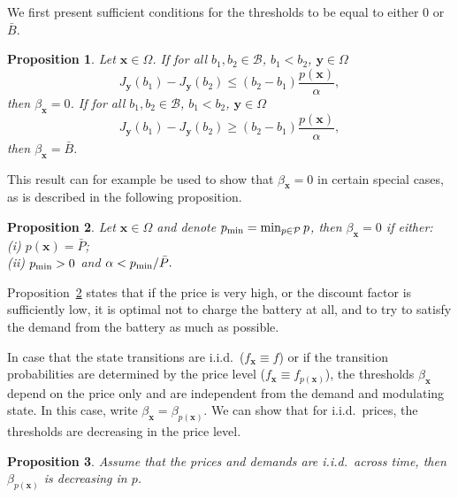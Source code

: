 \documentclass[journal]{IEEEtran}
\newcommand{\Bmax}{\bar{B}}
\newcommand{\Bu}{\mathcal{B}}
\newcommand{\Pmax}{\bar{P}}
\newcommand{\bfx}{\boldsymbol x}
\newcommand{\bfy}{\boldsymbol y}
\newcommand\1{\mathbf{1}}
\newtheorem{proposition}{Proposition}
\begin{document}
We first present sufficient conditions for the thresholds to be equal to either 0 or $\Bmax$.

\begin{proposition}\label{pro:sufficient_conditions}
Let $\bfx \in \Omega$. If for all $b_1,b_2 \in \Bu$, $b_1 < b_2$, $\bfy \in \Omega$
\begin{equation*}
J_{\bfy}(b_1) - J_{\bfy}(b_2) \le (b_2 - b_1) \frac{p(\bfx)}{\alpha},
\end{equation*}
then $\beta_{\bfx} = 0$. If for all $b_1,b_2 \in \Bu$, $b_1 < b_2$, $\bfy \in \Omega$
\begin{equation*}
J_{\bfy}(b_1) - J_{\bfy}(b_2) \ge (b_2 - b_1) \frac{p(\bfx)}{\alpha},
\end{equation*}
then $\beta_{\bfx} = \Bmax$.
\end{proposition}

This result can for example be used to show that $\beta_{\bfx} = 0$ in certain special cases, as is described in the following proposition.

\begin{proposition}\label{pro:max_price}
Let $\bfx \in \Omega$ and denote $p_{\rm min} = \min_{p \in \mathcal{P}} p$, then $\beta_{\bfx} = 0$ if either:\\
(i) $p(\bfx) = \Pmax$;\\
(ii) $p_{\rm min} >0$ and $\alpha < p_{\rm min}/\Pmax.$
\end{proposition}

Proposition~\ref{pro:max_price} states that if the price is very high, or the discount factor is sufficiently low, it is optimal not to charge the battery at all, and to try to satisfy the demand from the battery as much as possible.

In case that the state transitions are i.i.d.\ ($f_{\bfx} \equiv f$) or if the transition probabilities are determined by the price level ($f_{\bfx} \equiv f_{p(\bfx)}$), the thresholds $\beta_{\bfx}$ depend on the price only and are independent from the demand and modulating state. In this case, write $\beta_{\bfx} = \beta_{p(\bfx)}$. We can show that for i.i.d.\ prices, the thresholds are decreasing in the price level.
\begin{proposition}\label{pro:monotone_thresholds}
Assume that the prices and demands are i.i.d.\ across time, then $\beta_{p(\bfx)}$ is decreasing in $p$.
\end{proposition}
\end{document}
